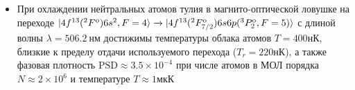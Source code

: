 \begin{itemize}
		\item При охлаждении нейтральных атомов тулия в магнито-оптической ловушке на переходе $\ket{4f^{13}(^2F^\text{o})6s^2, F = 4} \xrightarrow{} \ket{4f^{13}(^2F_{7/2}^\text{o})6s6p(^3P_2^\text{o}, F=5)}$ с длиной волны $\lambda = 506.2~\unit{нм}$ достижимы температуры облака атомов $T = 400\unit{нК}$, близкие к пределу отдачи используемого перехода ($T_r = 220\unit{нК}$), а также фазовая плотность $\text{PSD}\approx3.5\times10^{-4}$ при числе атомов в МОЛ порядка $N \approx 2\times 10^6$ и температуре $T\approx1\unit{мкК}$
\end{itemize}